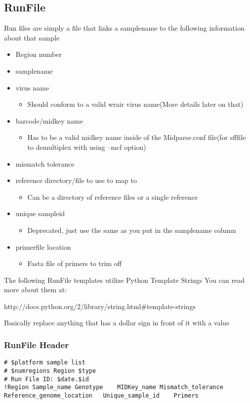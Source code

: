 \documentclass{article}
\begin{document}
 \subsection{RunFile}
Run files are simply a file that links a samplename to the following information about that sample
\begin{itemize}
 \item Region number
 \item samplename
 \item virus name
  \begin{itemize}
   \item Should conform to a valid wrair virus name(More details later on that)
  \end{itemize}
 \item barcode/midkey name
  \begin{itemize}
   \item Has to be a valid midkey name inside of the Midparse.conf file(for sfffile to demultiplex with using --mcf option)
  \end{itemize}
 \item mismatch tolerance
 \item reference directory/file to use to map to
  \begin{itemize}
   \item Can be a directory of reference files or a single reference
  \end{itemize}
 \item unique sampleid
  \begin{itemize}
   \item Deprecated, just use the same as you put in the samplename column
  \end{itemize}
 \item primerfile location
  \begin{itemize}
   \item Fasta file of primers to trim off
  \end{itemize}
\end{itemize}

The following RunFile templates utilize Python Template Strings
You can read more about them at:

http://docs.python.org/2/library/string.html\#template-strings

Basically replace anything that has a dollar sign in front of it with a value

\subsubsection{RunFile Header}
\begin{lstlisting}[basicstyle=\tiny]
# $platform sample list
# $numregions Region $type
# Run File ID: $date.$id
!Region	Sample_name	Genotype	MIDKey_name	Mismatch_tolerance	Reference_genome_location	Unique_sample_id	Primers	
\end{lstlisting}
\end{document}
